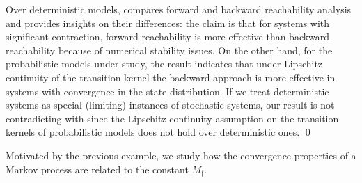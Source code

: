 \documentclass{LMCS}
\begin{document}
\begin{rem}
Over deterministic models,
\cite{IM07HSCC} compares forward and backward reachability analysis and provides insights on their differences:
the claim is that for systems with significant contraction, forward reachability is more effective than backward reachability because of numerical stability issues.
On the other hand, 
for the probabilistic models under study, 
the result indicates that under Lipschitz continuity of the transition kernel the backward approach is more effective in systems with convergence in the state distribution. 
If we treat deterministic systems as special (limiting) instances of stochastic systems, 
our result is not contradicting with \cite{IM07HSCC} since the Lipschitz continuity assumption on the transition kernels of probabilistic models does not hold over deterministic ones. \hfill\qed
\end{rem}
Motivated by the previous example, 
we study how the convergence properties of a Markov process are related to the constant $M_{\mathfrak f}$.
 
\end{document}

